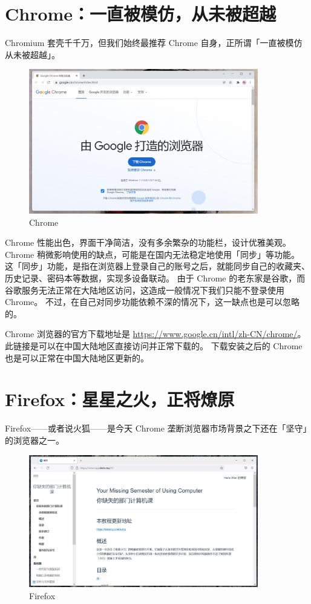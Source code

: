 \section{Chrome：一直被模仿，从未被超越}

Chromium 套壳千千万，但我们始终最推荐 Chrome 自身，正所谓「一直被模仿从未被超越」。

\begin{figure}[htb!]
  \centering
  \includegraphics[width=10cm]{assets/Chrome.jpg}
  \caption{Chrome}
  \label{Chrome}
\end{figure}

Chrome 性能出色，界面干净简洁，没有多余繁杂的功能栏，设计优雅美观。
Chrome 稍微影响使用的缺点，可能是在国内无法稳定地使用「同步」等功能。
这「同步」功能，是指在浏览器上登录自己的账号之后，就能同步自己的收藏夹、历史记录、密码本等数据，实现多设备联动。
由于 Chrome 的老东家是谷歌，而谷歌服务无法正常在大陆地区访问，这造成一般情况下我们只能不登录使用 Chrome。
不过，在自己对同步功能依赖不深的情况下，这一缺点也是可以忽略的。

Chrome 浏览器的官方下载地址是 \url{https://www.google.cn/intl/zh-CN/chrome/}。
此链接是可以在中国大陆地区直接访问并正常下载的。
下载安装之后的 Chrome 也是可以正常在中国大陆地区更新的。

\section{Firefox：星星之火，正将燎原}

Firefox——或者说火狐——是今天 Chrome 垄断浏览器市场背景之下还在「坚守」的浏览器之一。

\begin{figure}[htb!]
  \centering
  \includegraphics[width=10cm]{assets/Firefox.jpg}
  \caption{Firefox}
  \label{Firefox}
\end{figure}

